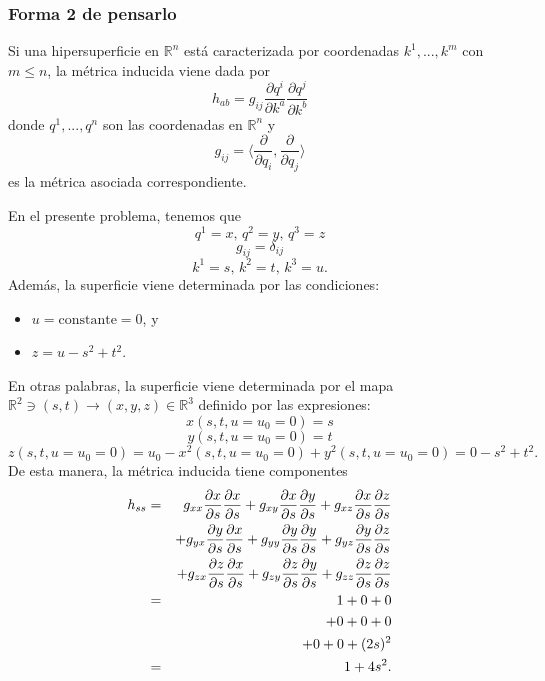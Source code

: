 \documentclass[aps,prl,twocolumn,groupedaddress]{revtex4-2}
\newcommand{\RR}{\mathbb{R}}
\begin{document}
\subsubsection{Forma 2 de pensarlo}

Si una hipersuperficie en $\RR^n$ está caracterizada por coordenadas $k^1,...,k^m$ con $m\leq n$, la métrica inducida viene dada por
$$
h_{ab}
=
g_{ij}
\frac{\partial q^i}{\partial k^a}
\frac{\partial q^j}{\partial k^b}
$$
donde $q^1,...,q^n$ son las coordenadas en $\RR^n$ y 
$$
g_{ij} 
= 
\bigg\langle 
\frac{\partial}{\partial q_i} 
,
\frac{\partial}{\partial q_j} 
\bigg\rangle
$$ 
es la métrica asociada correspondiente.

En el presente problema, tenemos que
$$
q^1 = x,\, 
q^2 = y,\, 
q^3 = z
$$
$$
g_{ij} = \delta_{ij}
$$
$$
k^1 = s,\,
k^2 = t,\,
k^3 = u
.
$$
Además, la superficie viene determinada por las condiciones:
\begin{itemize}
\item  $u=\mathrm{constante}=0$, y
\item $z = u - s^2 + t^2.$
\end{itemize}
En otras palabras, la superficie viene determinada por el mapa $\RR^2\ni (s,t)\to (x,y,z)\in \RR^3$ definido por las expresiones:
$$
x(s,t,u=u_0=0) = s
$$
$$
y(s,t,u=u_0=0) = t
$$
$$
z(s,t,u=u_0=0) = u_0 - x^2(s,t,u=u_0=0) + y^2(s,t,u=u_0=0) = 0 - s^2 + t^2
.
$$
De esta manera, la métrica inducida tiene componentes
\begin{eqnarray}
h_{ss}
&=&
g_{xx}
\frac{\partial x}{\partial s}
\frac{\partial x}{\partial s}
+
g_{xy}
\frac{\partial x}{\partial s}
\frac{\partial y}{\partial s}
+
g_{xz}
\frac{\partial x}{\partial s}
\frac{\partial z}{\partial s}
\notag
\\
&&
+
g_{yx}
\frac{\partial y}{\partial s}
\frac{\partial x}{\partial s}
+
g_{yy}
\frac{\partial y}{\partial s}
\frac{\partial y}{\partial s}
+
g_{yz}
\frac{\partial y}{\partial s}
\frac{\partial z}{\partial s}
\notag
\\
&&
+
g_{zx}
\frac{\partial z}{\partial s}
\frac{\partial x}{\partial s}
+
g_{zy}
\frac{\partial z}{\partial s}
\frac{\partial y}{\partial s}
+
g_{zz}
\frac{\partial z}{\partial s}
\frac{\partial z}{\partial s}
\notag
\\
&=&
1 + 0 + 0 \notag\\
&&
+ 0 + 0 + 0 \notag\\
&&
+ 0 + 0 + (2s)^2
\notag
\\
&=&
1 + 4s^2.
\notag
\end{eqnarray}
\end{document}
